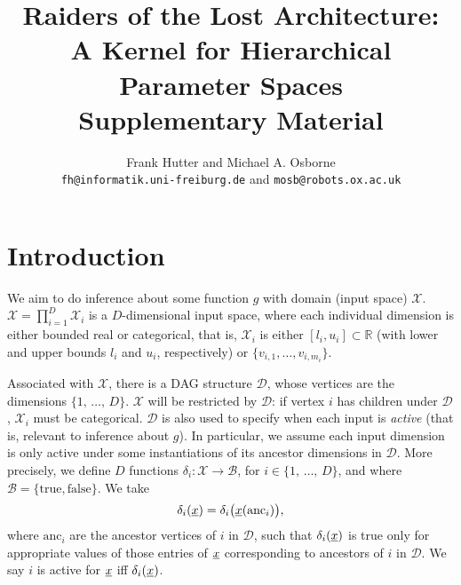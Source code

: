 \documentclass{article}
\newcommand{\vect}[1]{\underline{\smash{#1}}}
\renewcommand{\v}[1]{\vect{#1}}
\newcommand{\reals}{\mathds{R}}
\newcommand{\sX}{\mathcal{X}}
\newcommand{\sD}{\mathcal{D}}
\begin{document}
\title{Raiders of the Lost Architecture:\\A Kernel for Hierarchical Parameter Spaces\\ Supplementary Material}

\author{Frank Hutter and Michael A. Osborne\\
{\tt fh@informatik.uni-freiburg.de} and {\tt mosb@robots.ox.ac.uk}
}

\maketitle


\section{Introduction}

We aim to do inference about some function $g$ with domain (input space) $\sX$. $\sX = \prod_{i=1}^D \sX_i$ is a $D$-dimensional input space, where each individual dimension is either bounded real or categorical, that is, $\sX_i$ is either $[l_i, u_i] \subset \reals$ (with lower and upper bounds $l_i$ and $u_i$, respectively) or $\{v_{i,1}, \dots, v_{i,m_i}\}$. 

Associated with $\sX$, there is a DAG structure $\sD$, whose vertices are the dimensions $\{1,\,\ldots,\,D\}$. $\sX$ will be restricted by $\sD$: if vertex $i$ has children under $\sD$, $\sX_i$ must be categorical. $\sD$ is also used to specify when each input is \emph{active} (that is, relevant to inference about $g$). In particular, we assume each input dimension is only active under some instantiations of its ancestor dimensions in $\sD$. More precisely, we define $D$ functions $\delta_i\colon \sX\to \mathcal{B}$, for $i \in \{1,\,\ldots,\,D\}$, and where $\mathcal{B} = \{\text{true}, \text{false}\}$. We take 
\begin{equation}
 \delta_i(\v{x}) = \delta_i\bigl(\v{x}(\text{anc}_i)\bigr),
\end{equation}
where $\text{anc}_i$ are the ancestor vertices of $i$ in $\sD$, such that $\delta_i(\v{x})$ is true only for appropriate values of those entries of $\v{x}$ corresponding to ancestors of $i$ in $\sD$. We say $i$ is active for $\v{x}$ iff $\delta_i(\v{x})$.
\end{document}
